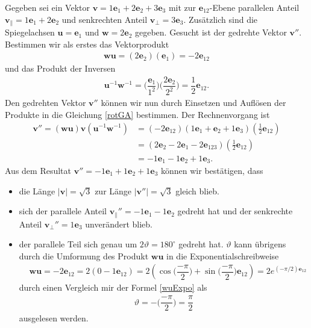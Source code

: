 \begin{beispiel} 
	Gegeben sei ein Vektor $\mathbf{v} = 1\mathbf{e}_1 + 2\mathbf{e}_2 + 3\mathbf{e}_3$ mit zur $\mathbf{e}_{12}$-Ebene parallelen Anteil $\mathbf{v_\parallel} = 1\mathbf{e}_1 + 2\mathbf{e}_2$ und senkrechten Anteil $\mathbf{v_\perp} = 3\mathbf{e}_3$. Zusätzlich sind die Spiegelachsen $\mathbf{u} = \mathbf{e}_1$ und $\mathbf{w} = 2\mathbf{e}_2$ gegeben. Gesucht ist der gedrehte Vektor $\mathbf{v}''$. Bestimmen wir als erstes das Vektorprodukt
	\begin{align*}
	\mathbf{wu} = (2\mathbf{e}_2)(\mathbf{e}_1) = -2\mathbf{e}_{12}
	\end{align*}
	und das Produkt der Inversen
	\begin{align*}
	\mathbf{u}^{-1}\mathbf{w}^{-1} = \biggl(\dfrac{\mathbf{e}_1}{1^2}\biggr) \biggl(\dfrac{2\mathbf{e}_2}{2^2}\biggl) = \dfrac{1}{2}\mathbf{e}_{12}.
	\end{align*}
	Den gedrehten Vektor $\mathbf{v}''$ können wir nun durch Einsetzen und Auflösen der Produkte in die Gleichung \eqref{rotGA} bestimmen. Der Rechnenvorgang ist
	\begin{align*}
	\mathbf{v}'' = (\mathbf{wu})\mathbf{v}(\mathbf{u}^{-1}\mathbf{w}^{-1}) &= (-2\mathbf{e}_{12})(1\mathbf{e}_1 + \mathbf{e}_2 + 1\mathbf{e}_3)(\textstyle{\frac{1}{2}}\mathbf{e}_{12})\\
	&= (2\mathbf{e}_2-2\mathbf{e}_1-2\mathbf{e}_{123})(\textstyle{\frac{1}{2}}\mathbf{e}_{12})\\
	&= -1\mathbf{e}_1 - 1\mathbf{e}_2 + 1\mathbf{e}_3.
	\end{align*}
	Aus dem Resultat $\mathbf{v}''= -1\mathbf{e}_1 + 1\mathbf{e}_2 + 1\mathbf{e}_3$ können wir bestätigen, dass
	\begin{itemize}
		\item die Länge $|\mathbf{v}| = \sqrt{3}$ zur Länge $|\mathbf{v}''|=\sqrt{3}$ gleich blieb.
		\item sich der parallele Anteil $\mathbf{v_\parallel}'' = -1\mathbf{e}_1 - 1\mathbf{e}_2$ gedreht hat und der senkrechte Anteil $\mathbf{v_\perp}'' = 1\mathbf{e}_3$ unverändert blieb.
		\item der parallele Teil sich genau um $2\vartheta=180^\circ$ gedreht hat. $\vartheta$ kann übrigens durch die Umformung des Produkt $\mathbf{wu}$ in die Exponentialschreibweise
		\begin{align}
		&\mathbf{wu} = -2\mathbf{e}_{12} = 2(0-1\mathbf{e}_{12})=2(\cos\biggl(\dfrac{-\pi}{2}\biggr) + \sin\biggl(\dfrac{-\pi}{2}\biggr)\mathbf{e}_{12}) = 2e^{(-\pi/2)\mathbf{e}_{12}}
		\end{align}
		durch einen Vergleich mir der Formel \eqref{wuExpo} als
		\begin{align*}
		\vartheta = -\biggl(\dfrac{-\pi}{2}\biggr) = \dfrac{\pi}{2}
		\end{align*}
		ausgelesen werden. \qedhere
	\end{itemize}
\end{beispiel} 
